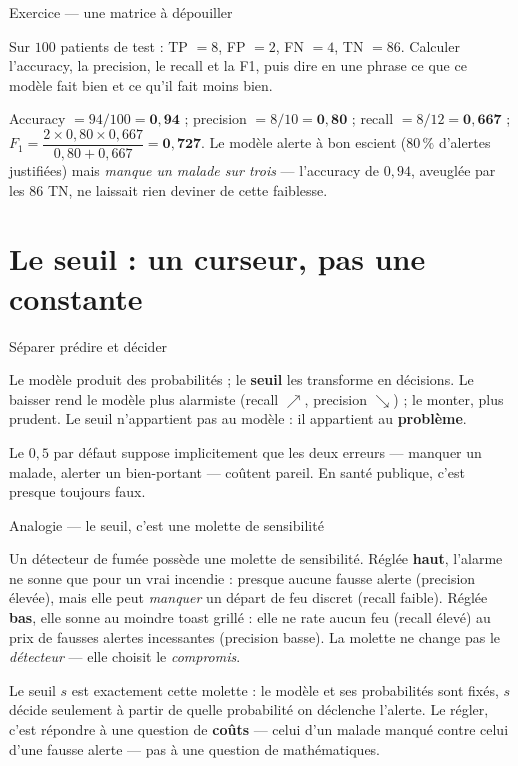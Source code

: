 \documentclass[aspectratio=169,11pt]{beamer}
\begin{document}
\begin{frame}{Exercice — une matrice à dépouiller}
\begin{ucadrec}[Énoncé]
{\small Sur $100$ patients de test : TP $= 8$, FP $= 2$, FN $= 4$, TN $= 86$. Calculer l'accuracy, la precision, le recall et la F1, puis dire en une phrase ce que ce modèle fait bien et ce qu'il fait moins bien.}
\end{ucadrec}
\pause
\begin{ucadex}[Correction]
{\small Accuracy $= 94/100 = \mathbf{0{,}94}$ ; precision $= 8/10 = \mathbf{0{,}80}$ ; recall $= 8/12 = \mathbf{0{,}667}$ ; $F_1 = \dfrac{2\times 0{,}80\times 0{,}667}{0{,}80+0{,}667} = \mathbf{0{,}727}$. Le modèle alerte à bon escient ($80\,\%$ d'alertes justifiées) mais \emph{manque un malade sur trois} — l'accuracy de $0{,}94$, aveuglée par les $86$ TN, ne laissait rien deviner de cette faiblesse.}
\end{ucadex}
\end{frame}

\section{Le seuil : un curseur, pas une constante}

\begin{frame}{Séparer prédire et décider}
\begin{ucaddef}
{\small Le modèle produit des probabilités ; le \textbf{seuil} les transforme en décisions. Le baisser rend le modèle plus alarmiste (recall $\nearrow$, precision $\searrow$) ; le monter, plus prudent. Le seuil n'appartient pas au modèle : il appartient au \textbf{problème}.}
\end{ucaddef}
{\small Le $0{,}5$ par défaut suppose implicitement que les deux erreurs — manquer un malade, alerter un bien-portant — coûtent pareil. En santé publique, c'est presque toujours faux.}
\end{frame}

\begin{frame}{Analogie — le seuil, c'est une molette de sensibilité}
\begin{ucadfront}
{\small Un détecteur de fumée possède une molette de sensibilité. Réglée \textbf{haut}, l'alarme ne sonne que pour un vrai incendie : presque aucune fausse alerte (precision élevée), mais elle peut \emph{manquer} un départ de feu discret (recall faible). Réglée \textbf{bas}, elle sonne au moindre toast grillé : elle ne rate aucun feu (recall élevé) au prix de fausses alertes incessantes (precision basse). La molette ne change pas le \emph{détecteur} — elle choisit le \emph{compromis}.}
\end{ucadfront}
{\small Le seuil $s$ est exactement cette molette : le modèle et ses probabilités sont fixés, $s$ décide seulement à partir de quelle probabilité on déclenche l'alerte. Le régler, c'est répondre à une question de \textbf{coûts} — celui d'un malade manqué contre celui d'une fausse alerte — pas à une question de mathématiques.}
\end{frame}
\end{document}
